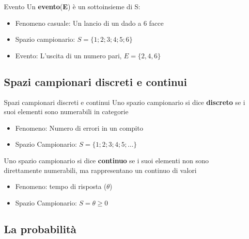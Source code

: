 \documentclass[
  ignorenonframetext,
  compress, aspectratio=149]{beamer}
\providecommand{\tightlist}{%
  \setlength{\itemsep}{0pt}\setlength{\parskip}{0pt}}
\begin{document}
\begin{frame}{Evento}
\label{evento}
Un \textbf{evento}(\textbf{E}) è un sottoinsieme di S:

\begin{itemize}
\tightlist
\item
  Fenomeno casuale: Un lancio di un dado a 6 facce
\item
  Spazio campionario: \(S =  \{1; 2 ; 3 ; 4 ; 5 ; 6 \}\)
\item
  Evento: L'uscita di un numero pari, \(E=\{2 ,4 ,6\}\)
\end{itemize}
\end{frame}

\subsection{Spazi campionari discreti e
continui}\label{spazi-campionari-discreti-e-continui}

\begin{frame}{Spazi campionari discreti e continui}
Uno spazio campionario si dice \textbf{discreto} se i suoi elementi sono
numerabili in categorie

\begin{itemize}
\tightlist
\item
  Fenomeno: Numero di errori in un compito
\item
  Spazio Campionario: \(S =  \{1; 2 ; 3 ; 4 ; 5 ; \ldots\}\)
\end{itemize}
\end{frame}

\begin{frame}
Uno spazio campionario si dice \textbf{continuo} se i suoi elementi non
sono direttamente numerabili, ma rappresentano un continuo di valori

\begin{itemize}
\tightlist
\item
  Fenomeno: tempo di risposta (\(\theta\))
\item
  Spazio Campionario: \(S = \theta \geq 0\)
\end{itemize}
\end{frame}

\subsection{La probabilità}\label{la-probabilituxe0-1}
\end{document}
